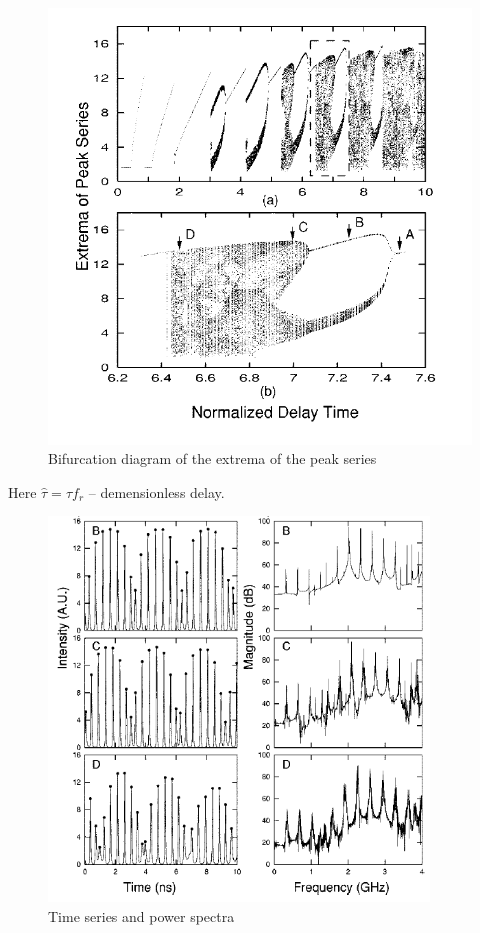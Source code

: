 \begin{minipage}{0.4\textwidth}
\begin{figure}[h]
    \centering
    \hspace{-10 mm}
    \includegraphics[width=1.2\textwidth]{images/bif.png}
    \caption{Bifurcation diagram of the extrema of the peak series}
\end{figure}
\end{minipage}
\hfill
\begin{minipage}{0.55\textwidth}
Here $\hat{\tau} = \tau f_r$ -- demensionless delay.

\begin{figure}[h]
    \centering
    \includegraphics[width=0.9\textwidth]{images/exmp2.png}
    \caption{Time series and power spectra}
\end{figure}

\end{minipage}
